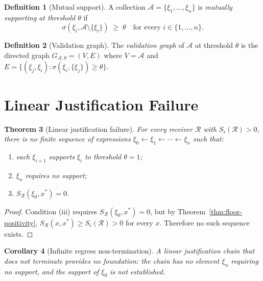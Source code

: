 \documentclass[twocolumn,11pt,a4paper]{article}
\theoremstyle{thmstyle}
\newtheorem{theorem}{Theorem}[section]
\newtheorem{corollary}[theorem]{Corollary}
\theoremstyle{thmstyle}
\theoremstyle{definition}
\newtheorem{definition}[theorem]{Definition}
\theoremstyle{remark}
\newcommand{\Ax}{\mathcal{A}}
\newcommand{\receiver}{\mathcal{R}}
\newcommand{\Sscalar}{S}
\newcommand{\Sfloor}{S_{\flat}}
\begin{document}
\begin{definition}[Mutual support]\label{def:mutual-support}
A collection $\Ax = \{\xi_{1}, \ldots, \xi_{n}\}$ is
\emph{mutually supporting at threshold $\theta$} if
\[
\sigma(\xi_{i}, \Ax \setminus \{\xi_{i}\}) \;\geq\; \theta
\quad \text{for every } i \in \{1, \ldots, n\}.
\]
\end{definition}

\begin{definition}[Validation graph]\label{def:val-graph}
The \emph{validation graph} of $\Ax$ at threshold
$\theta$ is the directed graph $G_{\Ax, \theta} =
(V, E)$ where $V = \Ax$ and
$E = \{(\xi_{j}, \xi_{i}) : \sigma(\xi_{i},
\{\xi_{j}\}) \geq \theta\}$.
\end{definition}

\section{Linear Justification Failure}
\label{sec:linear-failure}

\begin{theorem}[Linear justification failure]
\label{thm:linear-failure}
For every receiver $\receiver$ with $\Sfloor(\receiver)
> 0$, there is no finite sequence of expressions
$\xi_{0} \leftarrow \xi_{1} \leftarrow \cdots
\leftarrow \xi_{n}$ such that:
\begin{enumerate}[nosep,label=(\roman*)]
\item each $\xi_{i+1}$ supports $\xi_{i}$ to threshold
      $\theta = 1$;
\item $\xi_{n}$ requires no support;
\item $\Sscalar_{\receiver}(\xi_{0}, x^{*}) = 0$.
\end{enumerate}
\end{theorem}

\begin{proof}
Condition (iii) requires
$\Sscalar_{\receiver}(\xi_{0}, x^{*}) = 0$, but by
Theorem~\ref{thm:floor-positivity},
$\Sscalar_{\receiver}(x, x^{*}) \geq
\Sfloor(\receiver) > 0$ for every $x$.  Therefore
no such sequence exists.
\end{proof}

\begin{corollary}[Infinite regress non-termination]
\label{cor:inf-regress}
A linear justification chain that does not terminate
provides no foundation: the chain has no element
$\xi_{n}$ requiring no support, and the support of
$\xi_{0}$ is not established.
\end{corollary}
\end{document}
